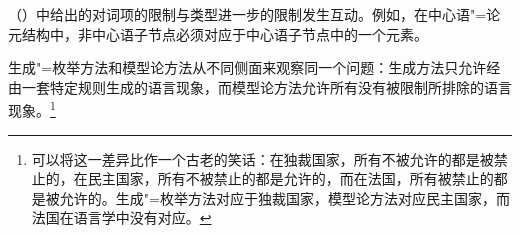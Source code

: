 
（）中给出的对词项的限制与类型进一步的限制发生互动。例如，在中心语"=论元结构中，非中心语子节点必须对应于中心语子节点\subcatlc 中的一个元素。

生成"=枚举方法和模型论方法从不同侧面来观察同一个问题：生成方法只允许经由一套特定规则生成的语言现象，而模型论方法允许所有没有被限制所排除的语言现象。\footnote{%
可以将这一差异比作一个古老的笑话：在独裁国家，所有不被允许的都是被禁止的，在民主国家，所有不被禁止的都是允许的，而在法国，所有被禁止的都是被允许的。生成"=枚举方法对应于独裁国家，模型论方法对应民主国家，而法国在语言学中没有对应。
}

